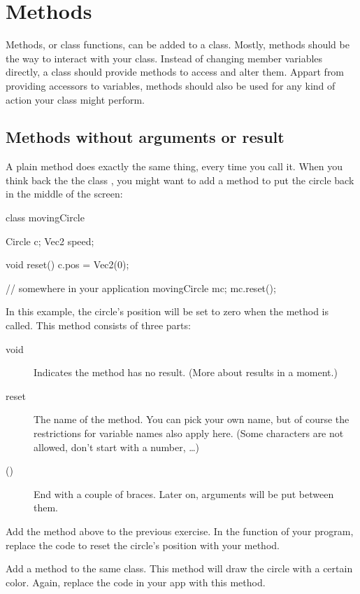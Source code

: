 \chapter{Methods}

Methods, or class functions, can be added to a class. Mostly, methods should be the way to interact with your class. Instead of changing member variables directly, a class should provide methods to access and alter them. Appart from providing accessors to variables, methods should also be used for any kind of action your class might perform. 

\section{Methods without arguments or result}

A plain method does exactly the same thing, every time you call it. When you think back the the class , you might want to add a method to put the circle back in the middle of the screen:

\begin{code}
class movingCircle {
  Circle c;
  Vec2 speed;
  
  void reset() {
    c.pos = Vec2(0);
  }
}

// somewhere in your application
movingCircle mc;
mc.reset();

\end{code}

In this example, the circle's position will be set to zero when the  method is called. This method consists of three parts:

\begin{description}
\item[void] Indicates the method has no result. (More about results in a moment.)
\item[reset] The name of the method. You can pick your own name, but of course the restrictions for variable names also apply here. (Some characters are not allowed, don't start with a number, \ldots)
\item[()] End with a couple of braces. Later on, arguments will be put between them.
\end{description}

\begin{exercise}
Add the  method above to the previous exercise. In the  function of your program, replace the code to reset the circle's position with your method.

Add a method  to the same class. This method will draw the circle with a certain color. Again, replace the code in your app with this method.
\end{exercise}

